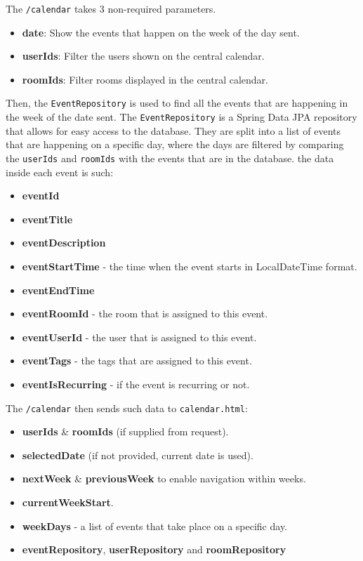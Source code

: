 The \texttt{/calendar} takes 3 non-required parameters.
\begin{itemize}
    \item \textbf{date}: Show the events that happen on the week of the day sent.
    \item \textbf{userIds}: Filter the users shown on the central calendar.
    \item \textbf{roomIds}: Filter rooms displayed in the central calendar.
\end{itemize}
Then, the \texttt{EventRepository} is used to find all the events that are happening in the week of the date sent.
The \texttt{EventRepository} is a Spring Data JPA repository that allows for easy access to the database.
They are split into a list of events that are happening on a specific day, where the days are filtered by comparing the \texttt{userIds} and \texttt{roomIds} with the events that are in the database.
the data inside each event is such:
\begin{itemize}
    \item \textbf{eventId}
    \item \textbf{eventTitle}
    \item \textbf{eventDescription}
    \item \textbf{eventStartTime} - the time when the event starts in LocalDateTime format.
    \item \textbf{eventEndTime}
    \item \textbf{eventRoomId} - the room that is assigned to this event.
    \item \textbf{eventUserId} - the user that is assigned to this event.
    \item \textbf{eventTags} - the tags that are assigned to this event.
    \item \textbf{eventIsRecurring} - if the event is recurring or not.
\end{itemize}
The \texttt{/calendar} then sends such data to \texttt{calendar.html}:
\begin{itemize}
    \item \textbf{userIds} \& \textbf{roomIds} (if supplied from request).
    \item \textbf{selectedDate} (if not provided, current date is used).
    \item \textbf{nextWeek} \& \textbf{previousWeek} to enable navigation within weeks.
    \item \textbf{currentWeekStart}.
    \item \textbf{weekDays} - a list of events that take place on a specific day.
    \item \textbf{eventRepository}, \textbf{userRepository} and \textbf{roomRepository}
\end{itemize}


